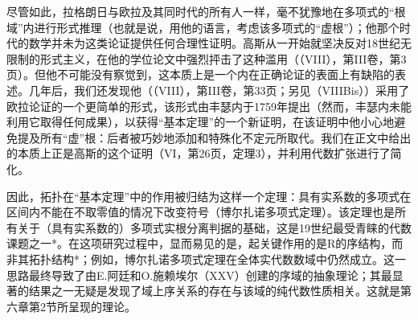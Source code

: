 尽管如此，拉格朗日与欧拉及其同时代的所有人一样，毫不犹豫地在多项式的“根域”内进行形式推理（也就是说，用他的语言，考虑该多项式的“虚根”）；他那个时代的数学并未为这类论证提供任何合理性证明。高斯从一开始就坚决反对18世纪无限制的形式主义，在他的学位论文中强烈抨击了这种滥用（（VIII），第III卷，第3页）。但他不可能没有察觉到，这本质上是一个内在正确论证的表面上有缺陷的表述。几年后，我们还发现他（（VIII），第III卷，第33页；另见（VIIIBis））采用了欧拉论证的一个更简单的形式，该形式由丰瑟内于1759年提出（然而，丰瑟内未能利用它取得任何成果），以获得“基本定理”的一个新证明，在该证明中他小心地避免提及所有“虚”根：后者被巧妙地添加和特殊化不定元所取代。我们在正文中给出的本质上正是高斯的这个证明（VI，第26页，定理3），并利用代数扩张进行了简化。

因此，拓扑在“基本定理”中的作用被归结为这样一个定理：具有实系数的多项式在区间内不能在不取零值的情况下改变符号（博尔扎诺多项式定理）。该定理也是所有关于（具有实系数的）多项式实根分离判据的基础，这是19世纪最受青睐的代数课题之一*。在这项研究过程中，显而易见的是，起关键作用的是R的序结构，而非其拓扑结构*；例如，博尔扎诺多项式定理在全体实代数数域中仍然成立。这一思路最终导致了由E.阿廷和O.施赖埃尔（XXV）创建的序域的抽象理论；其最显著的结果之一无疑是发现了域上序关系的存在与该域的纯代数性质相关。这就是第六章第2节所呈现的理论。

